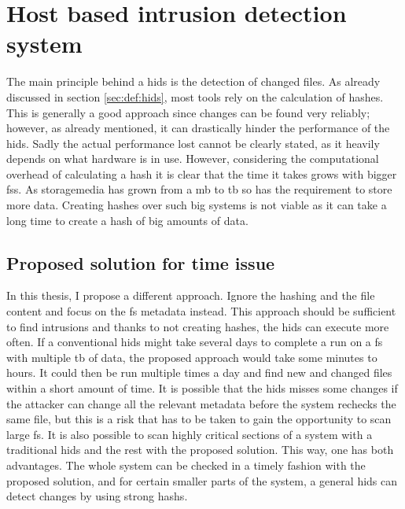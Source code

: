 \section{Host based intrusion detection system}
\label{sec:hids}

The main principle behind a \gls{hids} is the detection of changed files. As already discussed in section \ref{sec:def:hids}, most tools rely on the calculation of hashes. This is generally a good approach since changes can be found very reliably; however, as already mentioned, it can drastically hinder the performance of the \gls{hids}. Sadly the actual performance lost cannot be clearly stated, as it heavily depends on what hardware is in use. However, considering the computational overhead of calculating a \gls{hash} it is clear that the time it takes grows with bigger \glspl{fs}. As \gls{storagemedia} has grown from a \gls{mb} to \gls{tb} so has the requirement to store more data. Creating hashes over such big systems is not viable as it can take a long time to create a hash of big amounts of data. \cite{hash:slow, hash:veryslow, hash:speed}

\subsection{Proposed solution for time issue}

In this thesis, I propose a different approach. Ignore the hashing and the file content and focus on the \gls{fs} \gls{metadata} instead. This approach should be sufficient to find intrusions and thanks to not creating hashes, the \gls{hids} can execute more often. If a conventional \gls{hids} might take several days to complete a run on a \gls{fs} with multiple \gls{tb} of data, the proposed approach would take some minutes to hours. It could then be run multiple times a day and find new and changed files within a short amount of time. It is possible that the \gls{hids} misses some changes if the attacker can change all the relevant \gls{metadata} before the system rechecks the same file, but this is a risk that has to be taken to gain the opportunity to scan large \gls{fs}. It is also possible to scan highly critical sections of a system with a traditional \gls{hids} and the rest with the proposed solution. This way, one has both advantages. The whole system can be checked in a timely fashion with the proposed solution, and for certain smaller parts of the system, a general \gls{hids} can detect changes by using strong \glspl{hash}.

